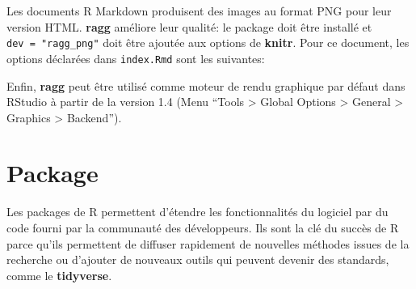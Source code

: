 \documentclass[
  12pt,
  french,
  a4paper,
  extrafontsizes,onecolumn,openright
  ]{memoir}
\newenvironment{Shaded}{\begin{snugshade}}{\end{snugshade}}
\newcommand{\DataTypeTok}[1]{\textcolor[rgb]{0.13,0.29,0.53}{#1}}
\newcommand{\DecValTok}[1]{\textcolor[rgb]{0.00,0.00,0.81}{#1}}
\newcommand{\FloatTok}[1]{\textcolor[rgb]{0.00,0.00,0.81}{#1}}
\newcommand{\KeywordTok}[1]{\textcolor[rgb]{0.13,0.29,0.53}{\textbf{#1}}}
\newcommand{\NormalTok}[1]{#1}
\newcommand{\OperatorTok}[1]{\textcolor[rgb]{0.81,0.36,0.00}{\textbf{#1}}}
\newcommand{\OtherTok}[1]{\textcolor[rgb]{0.56,0.35,0.01}{#1}}
\newcommand{\StringTok}[1]{\textcolor[rgb]{0.31,0.60,0.02}{#1}}
\begin{document}
Les documents R Markdown produisent des images au format PNG pour leur version HTML.
\textbf{ragg} améliore leur qualité: le package doit être installé et \texttt{dev\ =\ "ragg\_png"} doit être ajoutée aux options de \textbf{knitr}.
Pour ce document, les options déclarées dans \texttt{index.Rmd} sont les suivantes:

\scriptsize

\begin{Shaded}
\end{Shaded}

\normalsize

Enfin, \textbf{ragg} peut être utilisé comme moteur de rendu graphique par défaut dans RStudio à partir de la version 1.4 (Menu \enquote{Tools \textgreater{} Global Options \textgreater{} General \textgreater{} Graphics \textgreater{} Backend}).

\hypertarget{chap:package}{%
\chapter{Package}\label{chap:package}}

Les packages de R permettent d'étendre les fonctionnalités du logiciel par du code fourni par la communauté des développeurs.
Ils sont la clé du succès de R parce qu'ils permettent de diffuser rapidement de nouvelles méthodes issues de la recherche ou d'ajouter de nouveaux outils qui peuvent devenir des standards, comme le \textbf{tidyverse}.
\end{document}
